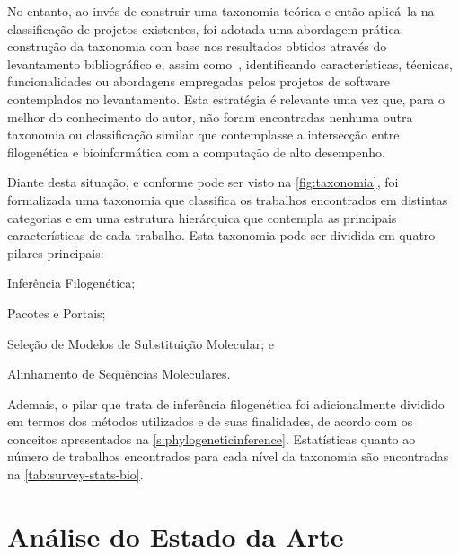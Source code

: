 \documentclass[english,brazilian]{UNISINOSmonografia} %
\begin{document}
No entanto, ao invés de construir uma taxonomia teórica e então aplicá--la na classificação de projetos existentes, foi adotada uma abordagem prática: construção  da taxonomia com base nos resultados obtidos através do levantamento bibliográfico e, assim como~\cite{Perera2013}, identificando características, técnicas, funcionalidades ou abordagens empregadas pelos projetos de software contemplados no levantamento.
Esta estratégia é relevante uma vez que, para o melhor do conhecimento do autor, não foram encontradas nenhuma outra taxonomia ou classificação similar que contemplasse a intersecção entre filogenética e bioinformática com a computação de alto desempenho.


Diante desta situação, e conforme pode ser visto na \autoref{fig:taxonomia}, foi formalizada uma taxonomia que classifica os trabalhos encontrados em distintas categorias e em uma estrutura hierárquica que contempla as principais características de cada trabalho.
Esta taxonomia pode ser dividida em quatro pilares principais:
\begin{inparaenum} 
	\item Inferência Filogenética;
	\item Pacotes e Portais;
	\item Seleção de Modelos de Substituição Molecular; e
	\item Alinhamento de Sequências Moleculares.
\end{inparaenum}


Ademais, o pilar que trata de inferência filogenética foi adicionalmente dividido em termos dos métodos utilizados e de suas finalidades, de acordo com os conceitos apresentados na \autoref{s:phylogeneticinference}.
Estatísticas quanto ao número de trabalhos encontrados para cada nível da taxonomia são encontradas na \autoref{tab:survey-stats-bio}.




\section{Análise do Estado da Arte}
\label{sec:analise-estadodaarte}

\end{document}

